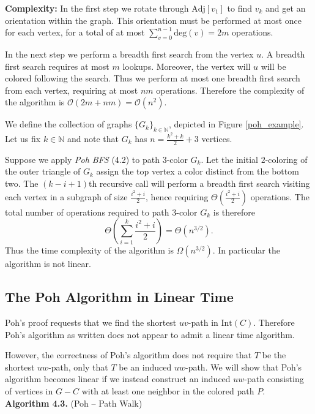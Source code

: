 \documentclass[letterpaper, 12pt]{article}
\theoremstyle{thm}
\begin{document}
\noindent\textbf{Complexity:} In the first step we rotate through
$\text{Adj}[v_1]$ to find $v_k$ and get an orientation within the graph. This
orientation must be performed at most once for each vertex, for a total of at
most $\sum_{v=0}^{n-1}\text{deg}(v)=2m$ operations.

In the next step we perform a breadth first search from the vertex $u$.
A breadth first search requires at most $m$ lookups. Moreover, the vertex will
$u$ will be colored following the search. Thus we perform at most one breadth
first search from each vertex, requiring at most $nm$ operations.
Therefore the complexity of the algorithm is $\mathcal{O}(2m + nm)
=\mathcal{O}(n^2)$.

We define the collection of graphs $\{G_k\}_{k\in\mathbb{N}}$, depicted in
Figure \ref{poh_example}. Let us fix $k\in\mathbb{N}$ and note that $G_k$ has
$n=\frac{k^2+k}{2}+3$ vertices.

Suppose we apply \textit{Poh BFS} (4.2) to path $3$-color $G_k$.
Let the initial $2$-coloring of the outer triangle of $G_k$ assign the top
vertex a color distinct from the bottom two.
The $(k-i+1)$th recursive call will perform a breadth
first search visiting each vertex in a subgraph of size $\frac{i^2+i}{2}$,
hence requiring $\Theta(\frac{i^2+i}{2})$ operations. The total number
of operations required to path $3$-color $G_k$ is therefore
\[
    \Theta\left(\sum_{i=1}^k \frac{i^2+i}{2}\right)=\Theta(n^{3/2}).
\]
Thus the time complexity of the algorithm is $\Omega(n^{3/2})$. In
particular the algorithm is not linear.\\

\subsection{The Poh Algorithm in Linear Time}

Poh's proof requests that we find the shortest $uv$-path in $\text{Int}(C)$.
Therefore Poh's algorithm as written does not appear to admit a linear time
algorithm.

However, the correctness of Poh's algorithm does not require that $T$
be the shortest $uw$-path, only that $T$ be an induced $uw$-path. We will show
that Poh's algorithm becomes linear if we instead construct an induced $uw$-path
consisting of vertices in $G-C$ with at least one neighbor in the colored
path $P$.\\

\noindent\textbf{Algorithm 4.3.} (Poh -- Path Walk)
\end{document}
